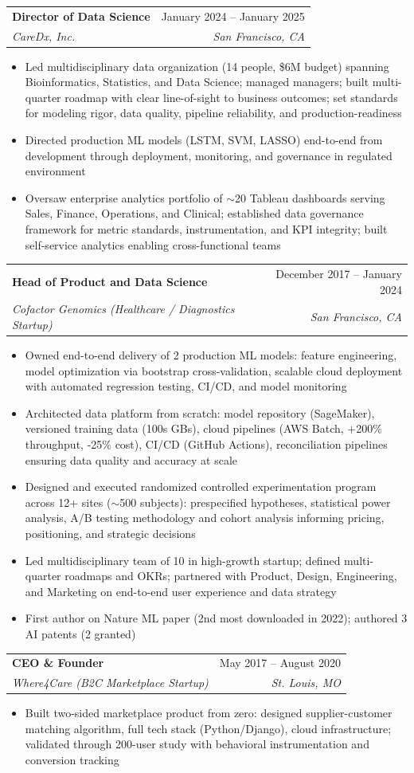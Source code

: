 \documentclass[letterpaper,11pt]{article}
\makeatletter
\newcommand{\resumeItem}[1]{
  \item\small{
    {#1 \vspace{-2pt}}
  }
}
\newcommand{\resumeSubheading}[4]{
  \vspace{-2pt}\item
    \begin{tabular*}{0.97\textwidth}[t]{l@{\extracolsep{\fill}}r}
      \textbf{#1} & #2 \\
      \textit{\small#3} & \textit{\small #4} \\
    \end{tabular*}\vspace{-7pt}
}
\newcommand{\resumeItemListStart}{\begin{itemize}}
\newcommand{\resumeItemListEnd}{\end{itemize}\vspace{-5pt}}
\makeatother
\begin{document}
    \resumeSubheading
      {Director of Data Science}{January 2024 -- January 2025}
      {CareDx, Inc.}{San Francisco, CA}
      \resumeItemListStart
        \resumeItem{Led multidisciplinary data organization (14 people, \$6M budget) spanning Bioinformatics, Statistics, and Data Science; managed managers; built multi-quarter roadmap with clear line-of-sight to business outcomes; set standards for modeling rigor, data quality, pipeline reliability, and production-readiness}
        \resumeItem{Directed production ML models (LSTM, SVM, LASSO) end-to-end from development through deployment, monitoring, and governance in regulated environment}
        \resumeItem{Oversaw enterprise analytics portfolio of $\sim$20 Tableau dashboards serving Sales, Finance, Operations, and Clinical; established data governance framework for metric standards, instrumentation, and KPI integrity; built self-service analytics enabling cross-functional teams}
      \resumeItemListEnd

    \resumeSubheading
      {Head of Product and Data Science}{December 2017 -- January 2024}
      {Cofactor Genomics (Healthcare / Diagnostics Startup)}{San Francisco, CA}
      \resumeItemListStart
        \resumeItem{Owned end-to-end delivery of 2 production ML models: feature engineering, model optimization via bootstrap cross-validation, scalable cloud deployment with automated regression testing, CI/CD, and model monitoring}
        \resumeItem{Architected data platform from scratch: model repository (SageMaker), versioned training data (100s GBs), cloud pipelines (AWS Batch, +200\% throughput, -25\% cost), CI/CD (GitHub Actions), reconciliation pipelines ensuring data quality and accuracy at scale}
        \resumeItem{Designed and executed randomized controlled experimentation program across 12+ sites ($\sim$500 subjects): prespecified hypotheses, statistical power analysis, A/B testing methodology and cohort analysis informing pricing, positioning, and strategic decisions}
        \resumeItem{Led multidisciplinary team of 10 in high-growth startup; defined multi-quarter roadmaps and OKRs; partnered with Product, Design, Engineering, and Marketing on end-to-end user experience and data strategy}
        \resumeItem{First author on Nature ML paper (2nd most downloaded in 2022); authored 3 AI patents (2 granted)}
      \resumeItemListEnd

    \resumeSubheading
      {CEO \& Founder}{May 2017 -- August 2020}
      {Where4Care (B2C Marketplace Startup)}{St. Louis, MO}
      \resumeItemListStart
        \resumeItem{Built two-sided marketplace product from zero: designed supplier-customer matching algorithm, full tech stack (Python/Django), cloud infrastructure; validated through 200-user study with behavioral instrumentation and conversion tracking}
      \resumeItemListEnd
\end{document}
